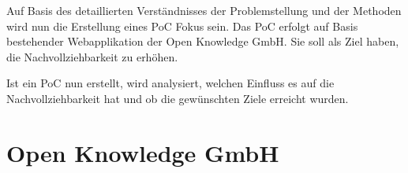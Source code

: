 Auf Basis des detaillierten Verständnisses der Problemstellung und der Methoden wird nun die Erstellung eines PoC Fokus sein. Das PoC erfolgt auf Basis bestehender Webapplikation der Open Knowledge GmbH. Sie soll als Ziel haben, die Nachvollziehbarkeit zu erhöhen.

Ist ein PoC nun erstellt, wird analysiert, welchen Einfluss es auf die Nachvollziehbarkeit hat und ob die gewünschten Ziele erreicht wurden.







\section{Open Knowledge GmbH}

